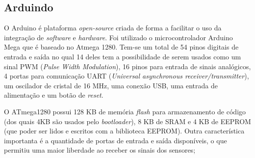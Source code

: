 \subsection{Arduindo}
\label{sec:arduino}

O Arduino é plataforma \textit{open-source} criada de forma a facilitar o uso da integração de \textit{software} e \textit{hardware}. Foi utilizado o microcontrolador Arduino Mega que é baseado no Atmega 1280. Tem-se um total de 54 pinos digitais de entrada e saída no qual 14 deles tem a possibilidade de serem usados como um sinal PWM (\textit{Pulse Width Modulation}), 16 pinos para entrada de sinais analógicos, 4 portas para comunicação UART (\textit{Universal asynchronous receiver/transmitter}), um oscilador de cristal de 16 MHz, uma conexão USB, uma entrada de alimentação e um botão de \textit{reset}.

O ATmega1280 possui 128 KB de memória \textit{flash} para armazenamento de código (dos quais 4KB são usados pelo \textit{bootloader}), 8 KB de SRAM e 4 KB de EEPROM (que poder ser lidos e escritos com a biblioteca EEPROM). Outra característica importanta é a quantidade de portas de entrada e saída disponíveis, o que permitiu uma maior liberdade ao receber os sinais dos sensores; 

